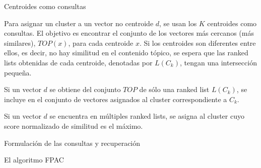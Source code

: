 \begin{frame}{Centroides como consultas}

Para asignar un cluster a un vector no centroide $d$, se
usan los $K$ centroides como consultas. El objetivo es encontrar el 
conjunto de los vectores más cercanos (más similares), $TOP(x)$,
para cada centroide $x$.
Si los centroides son diferentes entre ellos, es decir, no hay
similitud en el contenido tópico, se espera que las ranked lists
obtenidas de cada centroide, denotadas por $L(C_k)$,
tengan una intersección pequeña.

Si un vector $d$  se obtiene del conjunto $TOP$ de sólo
una ranked list $L(C_k)$, se incluye en el conjunto de vectores
asignados al cluster correspondiente a $C_k$.


Si un vector $d$ se encuentra en múltiples ranked lists, se asigna
al cluster cuyo score normalizado de similitud es el máximo.

\end{frame}


\begin{frame}{Formulación de las consultas y recuperación}

El algoritmo FPAC 

\end{frame}
